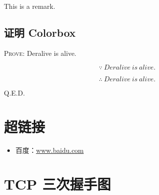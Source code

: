 \documentclass[14pt,a4paper,UTF8,twoside]{article}
\renewenvironment{proof}[1][Prove:]{\ProofBox\strut\textsc{#1}\space}{\endProofBox}
\begin{document}
\begin{rmr}
	This is a remark.
\end{rmr}

\subsection{证明 Colorbox}

\begin{proof}
	Deralive is alive.

	\[
		\because \ Deralive \ is \ alive.
	\]
	
	\[
		\therefore \ Deralive \ is \ alive.
	\]

	Q.E.D.
\end{proof}

\section{超链接}

\begin{itemize}
	\item 百度：\href{www.baidu.com}{\underline{www.baidu.com}}
\end{itemize}

\section{TCP 三次握手图}
\end{document}
